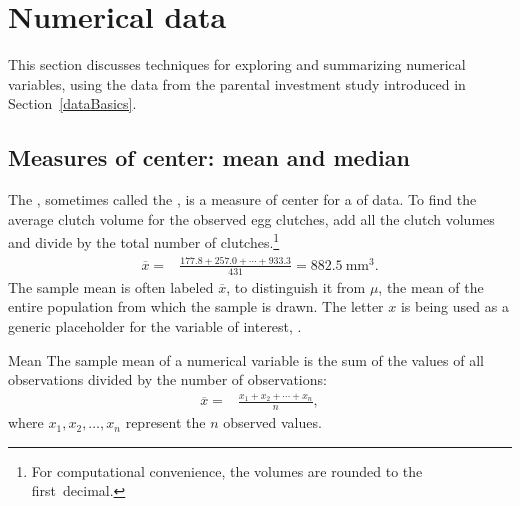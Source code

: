 


\section[Numerical data]{Numerical data}
\label{numericalData}


This section discusses techniques for exploring and summarizing numerical variables, using the  data from the parental investment study introduced in Section~\ref{dataBasics}.

\subsection{Measures of center: mean and median}
\label{measuresOfCenter}

The , sometimes called the , is a measure of center for a  of data. To find the average clutch volume for the observed egg clutches, add all the clutch volumes and divide by the total number of clutches.\footnote{For computational convenience, the volumes are rounded to the first~decimal.}
\begin{align*}
\overline{x} =& \frac{177.8 + 257.0 + \cdots + 933.3}{431} = 882.5\ \textrm{mm}^{3}.
\end{align*}
The sample mean is often labeled $\overline{x}$, to distinguish it from $\mu$, the mean of the entire population from which the sample is drawn. The letter $x$ is being used as a generic placeholder for the variable of interest, .

\begin{onebox}{Mean}
		The sample mean of a numerical variable is the sum of the values of all observations divided by the number of observations:
		\begin{align}
		\overline{x} =& \frac{x_1+x_2+\cdots+x_n}{n},
		\label{samplemeanEquation}
		\end{align}
		where $x_1, x_2, \dots, x_n$ represent the $n$ observed values.
\end{onebox}

